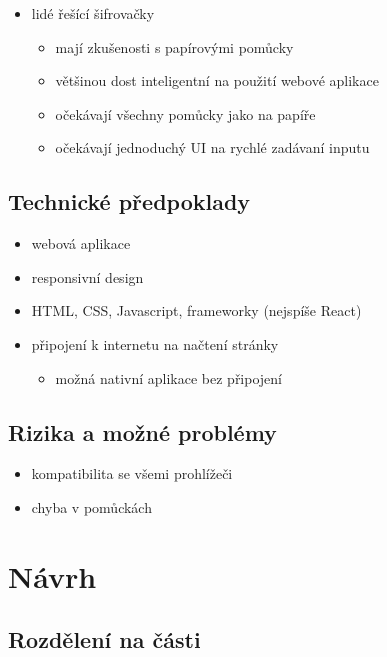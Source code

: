 \documentclass{article}
\begin{document}
\begin{itemize}
    \item lidé řešící šifrovačky
        \begin{itemize}
            \item mají zkušenosti s papírovými pomůcky
            \item většinou dost inteligentní na použití webové aplikace
            \item očekávají všechny pomůcky jako na papíře
            \item očekávají jednoduchý UI na rychlé zadávaní inputu
        \end{itemize}
\end{itemize}

\subsection{Technické předpoklady}

\begin{itemize}
    \item webová aplikace
    \item responsivní design
    \item HTML, CSS, Javascript, frameworky (nejspíše React)
    \item připojení k internetu na načtení stránky
        \begin{itemize}
            \item možná nativní aplikace bez připojení
        \end{itemize}
\end{itemize}

\subsection{Rizika a možné problémy}

\begin{itemize}
    \item kompatibilita se všemi prohlížeči
    \item chyba v pomůckách
\end{itemize}

\newpage

\section{Návrh}

\subsection{Rozdělení na části}
\end{document}
